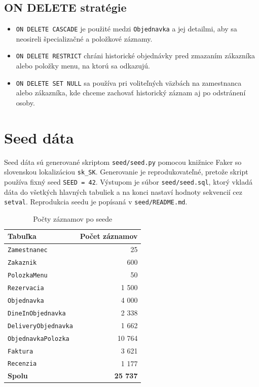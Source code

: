\documentclass[11pt, a4paper]{article}
\begin{document}
\subsection*{ON DELETE stratégie}

\begin{itemize}
    \item \texttt{ON DELETE CASCADE} je použité medzi \texttt{Objednavka} a jej detailmi, aby sa neosireli špecializačné a položkové záznamy.
    \item \texttt{ON DELETE RESTRICT} chráni historické objednávky pred zmazaním zákazníka alebo položky menu, na ktorú sa odkazujú.
    \item \texttt{ON DELETE SET NULL} sa používa pri voliteľných väzbách na zamestnanca alebo zákazníka, kde chceme zachovať historický záznam aj po odstránení osoby.
\end{itemize}

\clearpage
\section{Seed dáta}

Seed dáta sú generované skriptom \texttt{seed/seed.py} pomocou knižnice Faker so slovenskou lokalizáciou
\texttt{sk\_SK}. Generovanie je reprodukovateľné, pretože skript používa fixný seed
\texttt{SEED = 42}. Výstupom je súbor \texttt{seed/seed.sql}, ktorý vkladá dáta do všetkých hlavných
tabuliek a na konci nastaví hodnoty sekvencií cez \texttt{setval}. Reprodukcia seedu je popísaná v
\texttt{seed/README.md}.

\begin{table}[H]
\centering
\small
\begin{tabular}{lr}
\toprule
\textbf{Tabuľka} & \textbf{Počet záznamov} \\
\midrule
\texttt{Zamestnanec} & 25 \\
\texttt{Zakaznik} & 600 \\
\texttt{PolozkaMenu} & 50 \\
\texttt{Rezervacia} & 1 500 \\
\texttt{Objednavka} & 4 000 \\
\texttt{DineInObjednavka} & 2 338 \\
\texttt{DeliveryObjednavka} & 1 662 \\
\texttt{ObjednavkaPolozka} & 10 764 \\
\texttt{Faktura} & 3 621 \\
\texttt{Recenzia} & 1 177 \\
\midrule
\textbf{Spolu} & \textbf{25 737} \\
\bottomrule
\end{tabular}
\caption{Počty záznamov po seede}
\end{table}
\end{document}
